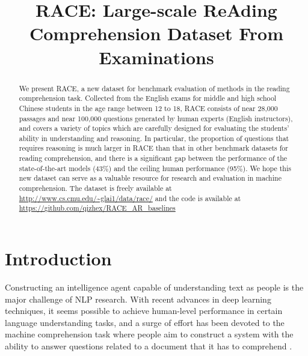 \title{RACE: Large-scale ReAding Comprehension Dataset From Examinations}

\begin{abstract}
We present RACE, a new dataset for benchmark evaluation of methods in the reading comprehension task. Collected from the English exams for middle and high school Chinese students in the age range between 12 to 18, RACE consists of near 28,000 passages and near 100,000 questions generated by human experts (English instructors), and covers a variety of topics which are carefully designed for evaluating the students' ability in  understanding and reasoning. In particular, the proportion of questions that requires reasoning is much larger in RACE than that in other benchmark datasets for reading comprehension, and there is a significant gap between the performance of the state-of-the-art models (43\%) and the ceiling human performance (95\%). We hope this new dataset can serve as a valuable resource for research and evaluation in machine comprehension. The dataset is freely available at \url{http://www.cs.cmu.edu/~glai1/data/race/} and the code is available at \url{https://github.com/qizhex/RACE_AR_baselines}
\end{abstract}

\section{Introduction}
\label{sec:intro}

Constructing an intelligence agent capable of understanding text as people is the major challenge of NLP research. With recent advances in deep learning techniques, it seems possible to achieve human-level performance in certain language understanding tasks, and a surge of effort has been devoted to the machine comprehension task where people aim to construct a system with the ability to answer questions related to a document that it has to comprehend \cite{chen2016thorough,kadlec2016text,dhingra2016gated, yang2017semi}. 

